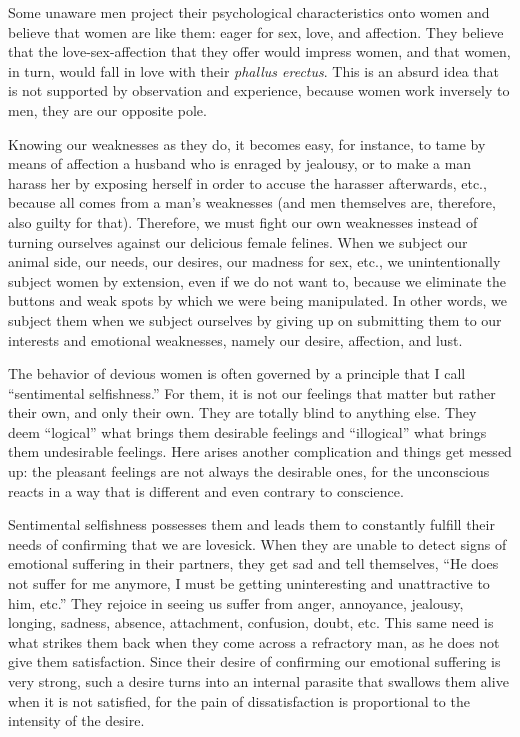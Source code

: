 \par Some unaware men project their psychological characteristics onto women and believe that women are like them: eager for sex, love, and affection. They believe that the love-sex-affection that they offer would impress women, and that women, in turn, would fall in love with their \textit{phallus erectus}. This is an absurd idea that is not supported by observation and experience, because women work inversely to men, they are our opposite pole.

\par Knowing our weaknesses as they do, it becomes easy, for instance, to tame by means of affection a husband who is enraged by jealousy, or to make a man harass her by exposing herself in order to accuse the harasser afterwards, etc., because all comes from a man's weaknesses (and men themselves are, therefore, also guilty for that). Therefore, we must fight our own weaknesses instead of turning ourselves against our delicious female felines. When we subject our animal side, our needs, our desires, our madness for sex, etc., we unintentionally subject women by extension, even if we do not want to, because we eliminate the buttons and weak spots by which we were being manipulated. In other words, we subject them when we subject ourselves by giving up on submitting them to our interests and emotional weaknesses, namely our desire, affection, and lust\footnotemark[38].


\par The behavior of devious women is often governed by a principle that I call \enquote{sentimental selfishness.} For them, it is not our feelings that matter but rather their own, and only their own. They are totally blind to anything else. They deem \enquote{logical} what brings them desirable feelings and \enquote{illogical} what brings them undesirable feelings. Here arises another complication and things get messed up: the pleasant feelings are not always the desirable ones, for the unconscious reacts in a way that is different and even contrary to conscience.

\par Sentimental selfishness possesses them and leads them to constantly fulfill their needs of confirming that we are lovesick. When they are unable to detect signs of emotional suffering in their partners, they get sad and tell themselves, \enquote{He does not suffer for me anymore, I must be getting uninteresting and unattractive to him, etc.} They rejoice in seeing us suffer from anger, annoyance, jealousy, longing, sadness, absence, attachment, confusion, doubt, etc. This same need is what strikes them back when they come across a refractory man, as he does not give them satisfaction. Since their desire of confirming our emotional suffering is very strong, such a desire turns into an internal parasite that swallows them alive when it is not satisfied, for the pain of dissatisfaction is proportional to the intensity of the desire\footnotemark[39].

